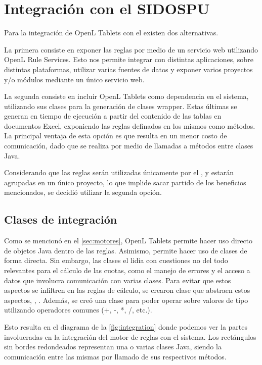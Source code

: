 \section{Integración con el SIDOSPU}\label{sec:integracion}

Para la integración de OpenL Tablets con el {\SIDOSPU} existen dos alternativas.

La primera consiste en exponer las reglas por medio de un servicio web utilizando OpenL Rule Services. Esto nos permite integrar con distintas aplicaciones, sobre distintas plataformas, utilizar varias fuentes de datos y exponer varios proyectos y/o módulos mediante un único servicio web.

La segunda consiste en incluir OpenL Tablets como dependencia en el sistema, utilizando sus clases para la generación de clases wrapper. Estas últimas se generan en tiempo de ejecución a partir del contenido de las tablas en documentos Excel, exponiendo las reglas definados en los mismos como métodos.
La principal ventaja de esta opción es que resulta en un menor costo de comunicación, dado que se realiza por medio de llamadas a métodos entre clases Java.

Considerando que las reglas serán utilizadas únicamente por el {\SIOSU}, y estarán agrupadas en un único proyecto, lo que implide sacar partido de los beneficios mencionados, se decidió utilizar la segunda opción. 

\subsection{Clases de integración}\label{ssec:integracion:clases}

Como se mencionó en el \cref{sec:motores}, OpenL Tablets permite hacer uso directo de objetos Java dentro de las reglas. Asimismo, permite hacer uso de clases de forma directa.
Sin embargo, las clases el {\SIDOSPU} lidia con cuestiones no del todo relevantes para el cálculo de las cuotas, como el manejo de errores y el acceso a datos que involucra comunicación con varias clases. Para evitar que estos aspectos se infiltren en las reglas de cálculo, se crearon clase que abstraen estos aspectos, , . Además, se creó una clase  para poder operar sobre valores de tipo  utilizando operadores comunes (+, -, *, /, etc.).

Esto resulta en el diagrama de la \cref{fig:integration} donde podemos ver la partes involucradas en la integración del motor de reglas con el sistema. Los rectángulos sin bordes redondeados representan una o varias clases Java, siendo la comunicación entre las mismas por llamado de sus respectivos métodos.

